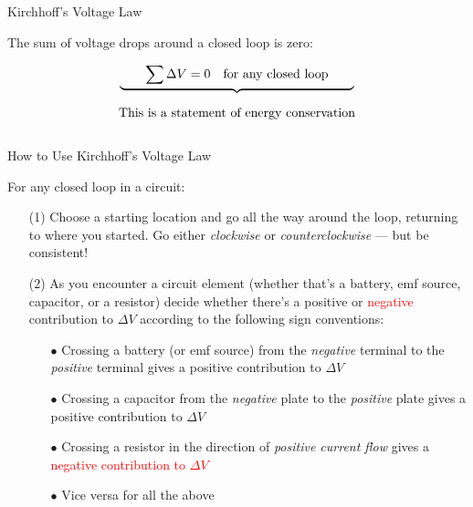 \documentclass{beamer}
\begin{document}
\begin{frame}{Kirchhoff's Voltage Law}

The sum of voltage drops around a closed loop is zero:

\begin{equation*}
    \underbrace{\hspace{2em}\sum \Delta V = 0 \quad \text{for any closed loop}\hspace{2em}}_{\parbox[c]{0.8\textwidth}{\begin{center} This is a statement of energy conservation \end{center}}}
\end{equation*}

\end{frame}

\begin{frame}{How to Use Kirchhoff's Voltage Law}

For any closed loop in a circuit: 

\begin{enumerate}

\item[(1)] Choose a starting location and go all the way around the loop, returning to where you started. Go either \emph{clockwise} or \emph{counterclockwise} --- but be consistent!

\item[(2)] As you encounter a circuit element (whether that's a battery, emf source, capacitor, or a resistor) decide whether there's a \textcolor{GREENE}{positive} or \textcolor{RED}{negative} contribution to $\Delta V$ according to the following sign conventions:

\begin{itemize}

\item[$\bullet$] Crossing a battery (or emf source) from the \emph{negative} terminal to the \emph{positive} terminal gives a \textcolor{GREENE}{positive contribution to $\Delta V$}

\item[$\bullet$] Crossing a capacitor from the \emph{negative} plate to the \emph{positive} plate gives a \textcolor{GREENE}{positive contribution to $\Delta V$}

\item[$\bullet$] Crossing a resistor in the direction of \emph{positive current flow} gives a \textcolor{RED}{negative contribution to $\Delta V$}

\item[$\bullet$] Vice versa for all the above

\end{itemize}

\end{enumerate}

\end{frame}
\end{document}
